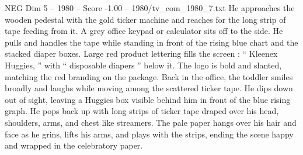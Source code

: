 \begin{textsample}{NEG Dim 5 – 1980 – Score -1.00 – 1980/tv\_com\_1980\_7.txt}
He approaches the wooden pedestal with the gold ticker machine and reaches for the long strip of tape feeding from it.
A grey office keypad or calculator sits off to the side.
He pulls and handles the tape while standing in front of the rising blue chart and the stacked diaper boxes.
Large red product lettering fills the screen : “ Kleenex Huggies, ” with “ disposable diapers ” below it.
The logo is bold and slanted, matching the red branding on the package.
Back in the office, the toddler smiles broadly and laughs while moving among the scattered ticker tape.
He dips down out of sight, leaving a Huggies box visible behind him in front of the blue rising graph.
He pops back up with long strips of ticker tape draped over his head, shoulders, arms, and chest like streamers.
The pale paper hangs over his hair and face as he grins, lifts his arms, and plays with the strips, ending the scene happy and wrapped in the celebratory paper.

\end{textsample}
